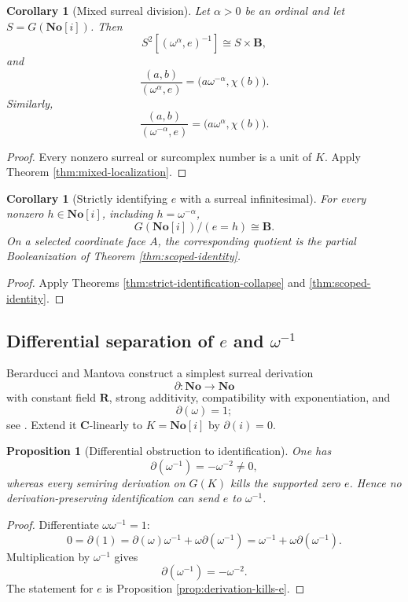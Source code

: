 \documentclass[11pt]{amsart}
\numberwithin{equation}{section}
\newtheorem{proposition}[theorem]{Proposition}
\newtheorem{corollary}[theorem]{Corollary}
\theoremstyle{definition}
\newcommand{\B}{\mathbf B}
\newcommand{\R}{\mathbf R}
\newcommand{\C}{\mathbf C}
\newcommand{\No}{\mathbf{No}}
\begin{document}
\begin{corollary}[Mixed surreal division]\label{cor:mixed-surreal-division}
Let $\alpha>0$ be an ordinal and let $S=G(\No[i])$.  Then
\[
S^2[(\omega^\alpha,e)^{-1}]
\cong
S\times\B,
\]
and
\[
\frac{(a,b)}{(\omega^\alpha,e)}
=
\bigl(a\omega^{-\alpha},\chi(b)\bigr).
\]
Similarly,
\[
\frac{(a,b)}{(\omega^{-\alpha},e)}
=
\bigl(a\omega^{\alpha},\chi(b)\bigr).
\]
\end{corollary}

\begin{proof}
Every nonzero surreal or surcomplex number is a unit of $K$.  Apply Theorem \ref{thm:mixed-localization}.
\end{proof}

\begin{corollary}[Strictly identifying $e$ with a surreal infinitesimal]
For every nonzero $h\in\No[i]$, including $h=\omega^{-\alpha}$,
\[
G(\No[i])/(e=h)\cong\B.
\]
On a selected coordinate face $A$, the corresponding quotient is the partial Booleanization of Theorem \ref{thm:scoped-identity}.
\end{corollary}

\begin{proof}
Apply Theorems \ref{thm:strict-identification-collapse} and \ref{thm:scoped-identity}.
\end{proof}

\subsection{Differential separation of \texorpdfstring{$e$ and $\omega^{-1}$}{e and omega inverse}}

Berarducci and Mantova construct a simplest surreal derivation
\[
\partial:\No\longrightarrow\No
\]
with constant field $\R$, strong additivity, compatibility with exponentiation, and
\[
\partial(\omega)=1;
\]
see \cite{BerarducciMantova}.  Extend it $\C$-linearly to $K=\No[i]$ by $\partial(i)=0$.

\begin{proposition}[Differential obstruction to identification]\label{prop:differential-obstruction}
One has
\[
\partial(\omega^{-1})=-\omega^{-2}\neq0,
\]
whereas every semiring derivation on $G(K)$ kills the supported zero $e$.  Hence no derivation-preserving identification can send $e$ to $\omega^{-1}$.
\end{proposition}

\begin{proof}
Differentiate $\omega\omega^{-1}=1$:
\[
0
=
\partial(1)
=
\partial(\omega)\omega^{-1}
+
\omega\partial(\omega^{-1})
=
\omega^{-1}
+
\omega\partial(\omega^{-1}).
\]
Multiplication by $\omega^{-1}$ gives
\[
\partial(\omega^{-1})=-\omega^{-2}.
\]
The statement for $e$ is Proposition \ref{prop:derivation-kills-e}.
\end{proof}
\end{document}
